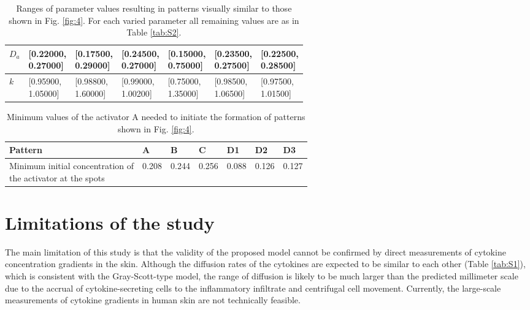 \begin{table}[hb]
\begin{tabular}{|l|l|l|l|l|l|l|}
$D_{a}$				& \thead{{[}0.22000, \\ 0.27000{]}} & \thead{{[}0.17500, \\ 0.29000{]}} & \thead{{[}0.24500, \\ 0.27000{]}} & \thead{{[}0.15000, \\ 0.75000{]}} & \thead{{[}0.23500, \\ 0.27500{]}} & \thead{{[}0.22500, \\ 0.28500{]}} \\ \hline
$k$					& \thead{{[}0.95900, \\ 1.05000{]}} & \thead{{[}0.98800, \\ 1.60000{]}} & \thead{{[}0.99000, \\ 1.00200{]}} & \thead{{[}0.75000, \\ 1.35000{]}} & \thead{{[}0.98500, \\ 1.06500{]}} & \thead{{[}0.97500, \\ 1.01500{]}} \\ \hline
\end{tabular}
\caption[Ranges of parameter values resulting in patterns visually similar to the simulated patterns]{Ranges of parameter values resulting in patterns visually similar to those shown in Fig. \ref{fig:4}. For each varied parameter all remaining values are as in Table \ref{tab:S2}.}
\label{tab:S3}
\end{table}

\begin{table}[hb]
\centering
\begin{tabular}{|l|l|l|l|l|l|l|}
\hline
\textbf{Pattern}                                            & \textbf{A} & \textbf{B} & \textbf{C} & \textbf{D1} & \textbf{D2} & \textbf{D3} \\ \hline
\thead{Minimum initial concentration of \\ the activator at the spots} & 0.208      & 0.244      & 0.256      & 0.088       & 0.126       & 0.127       \\ \hline
\end{tabular}
\caption[Minimum values of the activator A needed to initiate the formation of patterns]{Minimum values of the activator A needed to initiate the formation of patterns shown in Fig. \ref{fig:4}.}
\label{tab:S4}
\end{table}

\section{Limitations of the study}
The main limitation of this study is that the validity of the proposed model cannot be confirmed by direct measurements of cytokine concentration gradients in the skin. Although the diffusion rates of the cytokines are expected to be similar to each other (Table \ref{tab:S1}), which is consistent with the Gray-Scott-type model, the range of diffusion is likely to be much larger than the predicted millimeter scale due to the accrual of cytokine-secreting cells to the inflammatory infiltrate and centrifugal cell movement. Currently, the large-scale measurements of cytokine gradients in human skin are not technically feasible. 